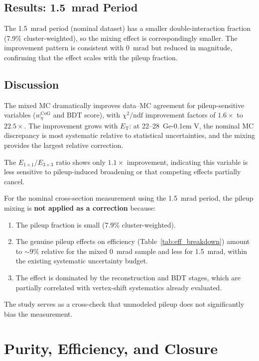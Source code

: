 \documentclass[11pt,a4paper]{article}
\newcommand{\ET}{\ensuremath{E_{\text{T}}}\xspace}
\newcommand{\wetacog}{\ensuremath{w_{\eta}^{\mathrm{CoG}}}\xspace}
\newcommand{\chidf}{\ensuremath{\chi^2/\mathrm{ndf}}\xspace}
\newcommand{\GeV}{\ifmmode {\mathrm{\ Ge\kern -0.1em V}}\else\textrm{Ge\kern -0.1em V}\fi\xspace}
\begin{document}
\subsection{Results: 1.5~mrad Period}
\label{subsec:results_1p5mrad}

The 1.5~mrad period (nominal dataset) has a smaller double-interaction fraction
(7.9\% cluster-weighted), so the mixing effect is correspondingly smaller.
The improvement pattern is consistent with 0~mrad but reduced in magnitude,
confirming that the effect scales with the pileup fraction.

\subsection{Discussion}
\label{subsec:showershape_discussion}

The mixed MC dramatically improves data--MC agreement for pileup-sensitive
variables (\wetacog and BDT score), with \chidf improvement factors of
$1.6\times$ to $22.5\times$.
The improvement grows with \ET: at 22--28~\GeV, the nominal MC discrepancy
is most systematic relative to statistical uncertainties, and the mixing provides
the largest relative correction.

The $E_{1\times1}/E_{3\times3}$ ratio shows only $1.1\times$ improvement,
indicating this variable is less sensitive to pileup-induced broadening or that
competing effects partially cancel.

For the nominal cross-section measurement using the 1.5~mrad period, the
pileup mixing is \textbf{not applied as a correction} because:
\begin{enumerate}
    \item The pileup fraction is small (7.9\% cluster-weighted).
    \item The genuine pileup effects on efficiency (Table~\ref{tab:eff_breakdown})
      amount to ${\sim}9\%$ relative for the mixed 0~mrad sample and less for
      1.5~mrad, within the existing systematic uncertainty budget.
    \item The effect is dominated by the reconstruction and BDT stages, which are
      partially correlated with vertex-shift systematics already evaluated.
\end{enumerate}
The study serves as a cross-check that unmodeled pileup does not significantly
bias the measurement.


\section{Purity, Efficiency, and Closure}
\label{sec:purity_eff}
\end{document}
